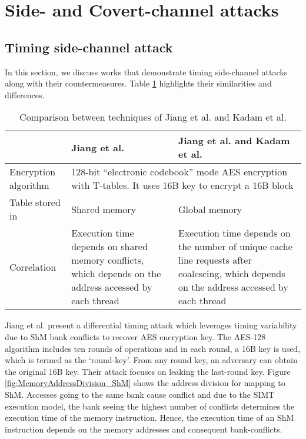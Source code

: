 \section{Side- and Covert-channel attacks}\label{sec:sidechannel}
\subsection{Timing side-channel attack}\label{sec:timingchannelattack}

In this section, we discuss works that demonstrate timing side-channel attacks   along with their countermeasures. Table \ref{tab:timingChannelAttack} highlights their similarities and differences. 

\begin{table}[htbp]
  \centering
  \caption{Comparison between techniques of Jiang et al. \cite{jiang2016complete,jiang2017novel} and Kadam et al. \cite{kadam2018rcoal}}
 
    \begin{tabular}{|p{2.7cm}|p{6cm}|p{7cm}|}
    \hline
          & Jiang et al. \cite{jiang2017novel} & Jiang et al. \cite{jiang2016complete} and Kadam et al. \cite{kadam2018rcoal} \\
    \hline
    Encryption algorithm & \multicolumn{2}{l|}{128-bit ``electronic codebook'' mode AES encryption with T-tables. It uses 16B key to encrypt a 16B block}    \\
    \hline
    Table stored in  & Shared memory &  Global memory  \\
    \hline
    Correlation & Execution time depends on shared memory conflicts, which depends on the address accessed by each thread & Execution time depends on the number of unique cache line requests after coalescing, which depends on the address accessed by each thread  \\
    \hline
    \end{tabular}%
  \label{tab:timingChannelAttack}%
\end{table}%



Jiang et al. \cite{jiang2017novel} present a differential timing attack which leverages timing variability due to ShM bank conflicts to recover AES encryption key. The AES-128 algorithm includes ten rounds of operations and in each round, a 16B key is used, which is termed as the `round-key'. From any round key, an adversary can obtain the original 16B key. Their attack focuses on leaking the last-round key. Figure \ref{fig:MemoryAddressDivision_ShM} shows the address division for mapping to ShM. Accesses going to the same bank cause conflict and due to the SIMT execution model, the bank seeing the highest number of conflicts determines the execution time of the memory instruction. Hence, the execution time of an ShM instruction depends on the memory addresses and consequent bank-conflicts.  
 

